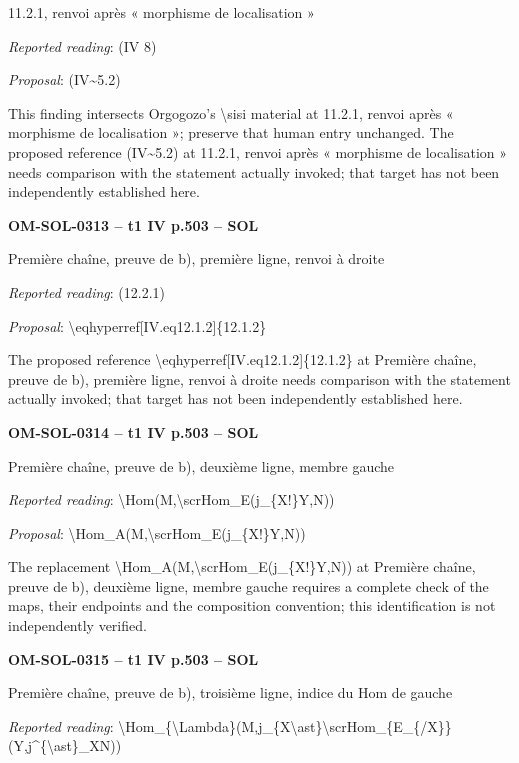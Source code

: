11.2.1, renvoi après « morphisme de localisation »\par
\emph{Reported reading}: (IV 8)\par
\emph{Proposal}: (IV\textasciitilde{}5.2)\par
This finding intersects Orgogozo's \textbackslash{}sisi material at 11.2.1, renvoi après « morphisme de localisation »; preserve that human entry unchanged. The proposed reference (IV\textasciitilde{}5.2) at 11.2.1, renvoi après « morphisme de localisation » needs comparison with the statement actually invoked; that target has not been independently established here.\par
\par\noindent\textbf{OM-SOL-0313 -- t1 IV p.503 -- SOL}\par
Première chaîne, preuve de b), première ligne, renvoi à droite\par
\emph{Reported reading}: (12.2.1)\par
\emph{Proposal}: \textbackslash{}eqhyperref[IV.eq12.1.2]\{12.1.2\}\par
The proposed reference \textbackslash{}eqhyperref[IV.eq12.1.2]\{12.1.2\} at Première chaîne, preuve de b), première ligne, renvoi à droite needs comparison with the statement actually invoked; that target has not been independently established here.\par
\par\noindent\textbf{OM-SOL-0314 -- t1 IV p.503 -- SOL}\par
Première chaîne, preuve de b), deuxième ligne, membre gauche\par
\emph{Reported reading}: \textbackslash{}Hom(M,\textbackslash{}scrHom\_E(j\_\{X!\}Y,N))\par
\emph{Proposal}: \textbackslash{}Hom\_A(M,\textbackslash{}scrHom\_E(j\_\{X!\}Y,N))\par
The replacement \textbackslash{}Hom\_A(M,\textbackslash{}scrHom\_E(j\_\{X!\}Y,N)) at Première chaîne, preuve de b), deuxième ligne, membre gauche requires a complete check of the maps, their endpoints and the composition convention; this identification is not independently verified.\par
\par\noindent\textbf{OM-SOL-0315 -- t1 IV p.503 -- SOL}\par
Première chaîne, preuve de b), troisième ligne, indice du Hom de gauche\par
\emph{Reported reading}: \textbackslash{}Hom\_\{\textbackslash{}Lambda\}(M,j\_\{X\textbackslash{}ast\}\textbackslash{}scrHom\_\{E\_\{/X\}\}(Y,j\textasciicircum{}\{\textbackslash{}ast\}\_XN))\par
